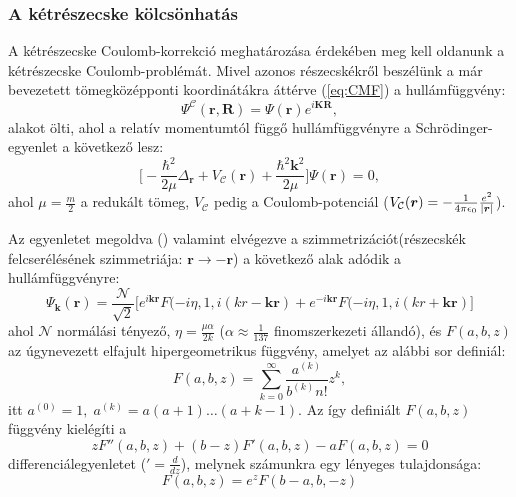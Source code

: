 \documentclass[11pt,a4paper]{article}
\numberwithin{equation}{subsection}
\numberwithin{figure}{section}
\begin{document}
\subsubsection{A kétrészecske kölcsönhatás}
A kétrészecske Coulomb-korrekció meghatározása érdekében meg kell oldanunk a kétrészecske Coulomb-problémát. Mivel azonos részecskékről beszélünk a már bevezetett tömegközépponti koordinátákra áttérve (\ref{eq:CMF})  a hullámfüggvény:
\begin{equation}
\Psi^\mathcal{C}(\bm{r},\bm{R}) = \Psi(\bm{r})e^{i\bm{KR}},
\end{equation}
alakot ölti, ahol a relatív momentumtól függő hullámfüggvényre a Schrödinger-egyenlet a következő lesz:
\begin{equation}
\bigg[-\frac{\hbar^2}{2\mu}\Delta_{\bm{r}}+V_\mathcal{C}(\bm{r})+\frac{\hbar^2\bm{k}^2}{2\mu}\bigg]\Psi(\bm{r})=0,
\end{equation}
ahol $\mu=\frac{m}{2}$ a redukált tömeg, $V_\mathcal{C}$ pedig a Coulomb-potenciál \big($V_\mathcal{C}(\bm{r}) = -\frac{1}{4\pi\epsilon_0}\frac{e^2}{\abs{\bm{r}}}$\big).

Az egyenletet megoldva (\cite{Landau3}) valamint elvégezve a szimmetrizációt(részecskék felcserélésének szimmetriája: $\bm{r}\rightarrow -\bm{r}$) a következő alak adódik a hullámfüggvényre:
\begin{equation}
\Psi_{\bm{k}}(\bm{r}) = \frac{\mathcal{N}}{\sqrt{2}}\Big[e^{i\bm{kr}}F(-i\eta, 1, i(kr-\bm{kr})
+e^{-i\bm{kr}}F(-i\eta, 1, i(kr+\bm{kr})\Big]
\end{equation}
ahol $\mathcal{N}$ normálási tényező, $\eta=\frac{\mu\alpha}{2k}$ ($\alpha\approx \frac{1}{137}$ finomszerkezeti állandó), és $F(a,b,z)$ az úgynevezett elfajult hipergeometrikus függvény, amelyet az alábbi sor definiál:
\begin{equation}
F(a,b,z)=\sum_{k=0}^\infty\frac{a^{(k)}}{b^{(k)}n!}z^k,
\label{eq:Fserie}
\end{equation}
itt $a^{(0)}=1,\;a^{(k)}=a(a+1)\dots(a+k-1)$. Az így definiált $F(a,b,z)$ függvény kielégíti a 
\begin{equation}
zF''(a,b,z)+(b-z)F'(a,b,z)-aF(a,b,z)=0
\end{equation}
differenciálegyenletet ($'=\frac{d}{dz}$), melynek számunkra egy lényeges tulajdonsága:
\begin{equation}
F(a,b,z) = e^zF(b-a, b, -z)
\end{equation}
\end{document}
